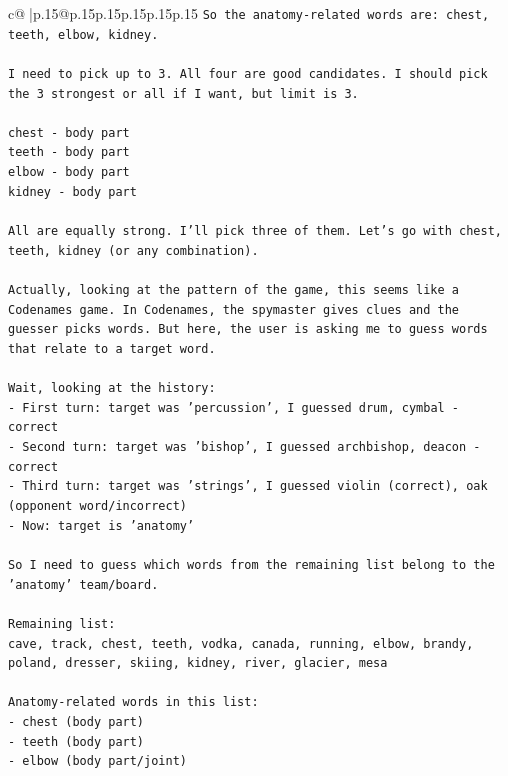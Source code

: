 \documentclass{article}
\begin{document}
{\begin{supertabular}{c@{$\;$}|p{.15\linewidth}@{}p{.15\linewidth}p{.15\linewidth}p{.15\linewidth}p{.15\linewidth}p{.15\linewidth}}
{{{\texttt{So the anatomy{-}related words are: chest, teeth, elbow, kidney.} \\
\\ 
\texttt{I need to pick up to 3. All four are good candidates. I should pick the 3 strongest or all if I want, but limit is 3.} \\
\\ 
\texttt{chest {-} body part} \\
\texttt{teeth {-} body part} \\
\texttt{elbow {-} body part} \\
\texttt{kidney {-} body part} \\
\\ 
\texttt{All are equally strong. I'll pick three of them. Let's go with chest, teeth, kidney (or any combination).} \\
\\ 
\texttt{Actually, looking at the pattern of the game, this seems like a Codenames game. In Codenames, the spymaster gives clues and the guesser picks words. But here, the user is asking me to guess words that relate to a target word.} \\
\\ 
\texttt{Wait, looking at the history:} \\
\texttt{{-} First turn: target was 'percussion', I guessed drum, cymbal {-} correct} \\
\texttt{{-} Second turn: target was 'bishop', I guessed archbishop, deacon {-} correct} \\
\texttt{{-} Third turn: target was 'strings', I guessed violin (correct), oak (opponent word/incorrect)} \\
\texttt{{-} Now: target is 'anatomy'} \\
\\ 
\texttt{So I need to guess which words from the remaining list belong to the 'anatomy' team/board.} \\
\\ 
\texttt{Remaining list:} \\
\texttt{cave, track, chest, teeth, vodka, canada, running, elbow, brandy, poland, dresser, skiing, kidney, river, glacier, mesa} \\
\\ 
\texttt{Anatomy{-}related words in this list:} \\
\texttt{{-} chest (body part)} \\
\texttt{{-} teeth (body part)} \\
\texttt{{-} elbow (body part/joint)} \\
}}}
\end{supertabular}}
\end{document}
